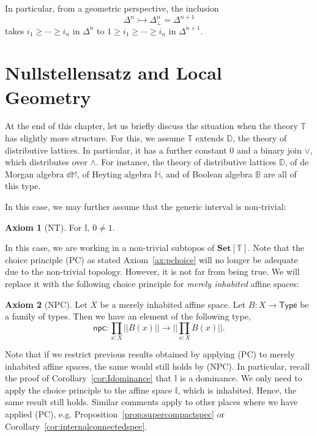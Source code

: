 \documentclass[12pt]{amsart}
\theoremstyle{definition}
\newtheorem{axiom}{Axiom}
\newcommand{\mb}[1]{\mathbf{#1}}
\newcommand{\mbb}[1]{\mathbb{#1}}
\newcommand{\T}{\mbb T}
\newcommand{\I}{\mbb I}
\newcommand{\ms}[1]{\mathsf{#1}}
\newcommand{\Set}{\mb{Set}}
\newcommand{\inj}{\rightarrowtail}
\newcommand{\prt}{_{\bot}}
\newcommand{\pss}[1]{||#1||} %
\newcommand{\tp}{\ms{Type}}
\begin{document}
In particular, from a geometric perspective, the inclusion
\[ \Delta^n \inj \Delta^n\prt = \Delta^{n+1} \]
takes $i_1 \ge \cdots \ge i_n$ in $\Delta^n$ to $1 \ge i_1 \ge \cdots \ge i_n$ in $\Delta^{n+1}$. 


\section{Nullstellensatz and Local Geometry}\label{sec:nullstellensatz_and_local_geometry}

At the end of this chapter, let us briefly discuss the situation when the theory $\T$ has slightly more structure. For this, we assume $\T$ extends $\mbb D$, the theory of distributive lattices. In particular, it has a further constant $0$ and a binary join $\vee$, which distributes over $\wedge$. For instance, the theory of distributive lattices $\mbb D$, of de Morgan algebra $\mbb{dM}$, of Heyting algebra $\mbb H$, and of Boolean algebra $\mbb B$ are all of this type.

In this case, we may further assume that the generic interval is non-trivial:

\begin{axiom}[NT]\label{ax:nt}
  For $\I$, $0 \neq 1$.
\end{axiom}

In this case, we are working in a non-trivial subtopos of $\Set[\T]$. Note that the choice principle (PC) as stated Axiom~\ref{ax:pchoice} will no longer be adequate due to the non-trivial topology. However, it is not far from being true. We will replace it with the following choice principle for \emph{merely inhabited} affine spaces:

\begin{axiom}[NPC]\label{ax:npchoice}
  Let $X$ be a merely inhabited affine space. Let $B : X \to \tp$ be a family of types. Then we have an element of the following type,
  \[ \ms{npc} : \prod_{x:X}\pss{B(x)} \to \pss{\prod_{x:X}B(x)}. \]
\end{axiom}

Note that if we restrict previous results obtained by applying (PC) to merely inhabited affine spaces, the same would still holds by (NPC). In particular, recall the proof of Corollary~\ref{cor:Idominance} that $\I$ is a dominance. We only need to apply the choice principle to the affine space $\I$, which is inhabited. Hence, the same result still holds. Similar comments apply to other places where we have applied (PC), e.g. Proposition~\ref{prop:supercompactspec} or Corollary~\ref{cor:internalconnectedspec}.
\end{document}

